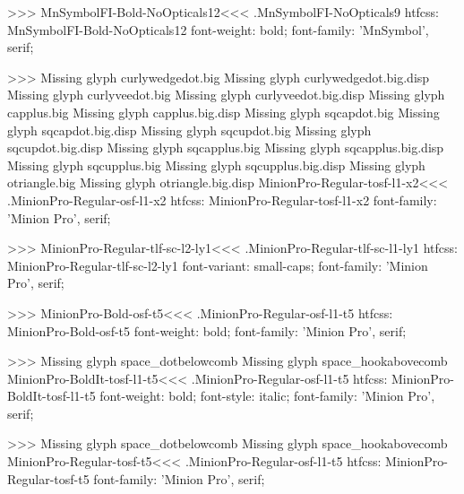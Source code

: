 {>>>
\<MnSymbolFI-Bold-NoOpticals12\><<<
.MnSymbolFI-NoOpticals9
htfcss:  MnSymbolFI-Bold-NoOpticals12  font-weight: bold; font-family: 'MnSymbol', serif;

>>>
Missing glyph	curlywedgedot.big
Missing glyph	curlywedgedot.big.disp
Missing glyph	curlyveedot.big
Missing glyph	curlyveedot.big.disp
Missing glyph	capplus.big
Missing glyph	capplus.big.disp
Missing glyph	sqcapdot.big
Missing glyph	sqcapdot.big.disp
Missing glyph	sqcupdot.big
Missing glyph	sqcupdot.big.disp
Missing glyph	sqcapplus.big
Missing glyph	sqcapplus.big.disp
Missing glyph	sqcupplus.big
Missing glyph	sqcupplus.big.disp
Missing glyph	otriangle.big
Missing glyph	otriangle.big.disp
\<MinionPro-Regular-tosf-l1-x2\><<<
.MinionPro-Regular-osf-l1-x2
htfcss:  MinionPro-Regular-tosf-l1-x2  font-family: 'Minion Pro', serif;

>>>
\<MinionPro-Regular-tlf-sc-l2-ly1\><<<
.MinionPro-Regular-tlf-sc-l1-ly1
htfcss:  MinionPro-Regular-tlf-sc-l2-ly1  font-variant: small-caps; font-family: 'Minion Pro', serif;

>>>
\<MinionPro-Bold-osf-t5\><<<
.MinionPro-Regular-osf-l1-t5
htfcss:  MinionPro-Bold-osf-t5  font-weight: bold; font-family: 'Minion Pro', serif;

>>>
Missing glyph	space_dotbelowcomb
Missing glyph	space_hookabovecomb
\<MinionPro-BoldIt-tosf-l1-t5\><<<
.MinionPro-Regular-osf-l1-t5
htfcss:  MinionPro-BoldIt-tosf-l1-t5  font-weight: bold; font-style: italic; font-family: 'Minion Pro', serif;

>>>
Missing glyph	space_dotbelowcomb
Missing glyph	space_hookabovecomb
\<MinionPro-Regular-tosf-t5\><<<
.MinionPro-Regular-osf-l1-t5
htfcss:  MinionPro-Regular-tosf-t5  font-family: 'Minion Pro', serif;

}

